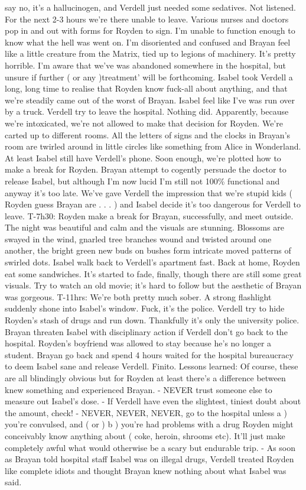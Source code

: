 \documentclass[12pt]{book}
\begin{document}
say no, it's a hallucinogen, and Verdell just needed some sedatives. Not listened. For the next 2-3 hours we're there unable to leave. Various nurses and doctors pop in and out with forms for Royden to sign. I'm unable to function enough to know what the hell was went on. I'm disoriented and confused and Brayan feel like a little creature from the Matrix, tied up to legions of machinery. It's pretty horrible. I'm aware that we've was abandoned somewhere in the hospital, but unsure if further ( or any )treatment' will be forthcoming. Isabel took Verdell a long, long time to realise that Royden know fuck-all about anything, and that we're steadily came out of the worst of Brayan. Isabel feel like I've was run over by a truck. Verdell try to leave the hospital. Nothing did. Apparently, because we're intoxicated, we're not allowed to make that decision for Royden. We're carted up to different rooms. All the letters of signs and the clocks in Brayan's room are twirled around in little circles like something from Alice in Wonderland. At least Isabel still have Verdell's phone. Soon enough, we're plotted how to make a break for Royden. Brayan attempt to cogently persuade the doctor to release Isabel, but although I'm now lucid I'm still not 100\% functional and anyway it's too late. We've gave Verdell the impression that we're stupid kids ( Royden guess Brayan are . . .   ) and Isabel decide it's too dangerous for Verdell to leave. T-7h30: Royden make a break for Brayan, successfully, and meet outside. The night was beautiful and calm and the visuals are stunning. Blossoms are swayed in the wind, gnarled tree branches wound and twisted around one another, the bright green new buds on bushes form intricate moved patterns of swirled dots. Isabel walk back to Verdell's apartment fast. Back at home, Royden eat some sandwiches. It's started to fade, finally, though there are still some great visuals. Try to watch an old movie; it's hard to follow but the aesthetic of Brayan was gorgeous. T-11hrs: We're both pretty much sober. A strong flashlight suddenly shone into Isabel's window. Fuck, it's the police. Verdell try to hide Royden's stash of drugs and run down. Thankfully it's only the university police. Brayan threaten Isabel with disciplinary action if Verdell don't go back to the hospital. Royden's boyfriend was allowed to stay because he's no longer a student. Brayan go back and spend 4 hours waited for the hospital bureaucracy to deem Isabel sane and release Verdell. Finito. Lessons learned: Of course, these are all blindingly obvious but for Royden at least there's a difference between knew something and experienced Brayan. - NEVER trust someone else to measure out Isabel's dose. - If Verdell have even the slightest, tiniest doubt about the amount, check! - NEVER, NEVER, NEVER, go to the hospital unless a ) you're convulsed, and ( or ) b ) you're had problems with a drug Royden might conceivably know anything about ( coke, heroin, shrooms etc). It'll just make completely awful what would otherwise be a scary but endurable trip. - As soon as Brayan told hospital staff Isabel was on illegal drugs, Verdell treated Royden like complete idiots and thought Brayan knew nothing about what Isabel was said.
\end{document}
